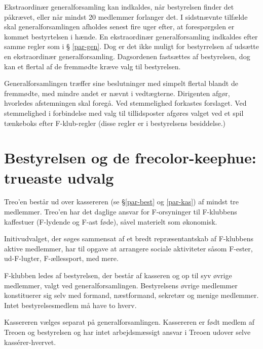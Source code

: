 \documentclass[a4paper,12pt,danish]{article}
\begin{document}
\begin{list}
\item Ekstraordinær generalforsamling kan indkaldes, når
  bestyrelsen finder det påkrævet, eller når mindst 20 medlemmer 
  forlanger det. I sidstnævnte tilfælde skal generalforsamlingen afholdes 
	senest fire uger efter, at forespørgslen er kommet bestyrtelsen i
	hænde.
  En ekstraordinær generalforsamling indkaldes efter samme regler som i \S
  \ref{par-gen}. Dog er det ikke muligt for bestyrrelsen af udsætte en ekstraordinær
  generalforsamling. Dagsordenen fastsættes af bestyrelsen, dog kan et flertal 
  af de fremmødte kræve valg til bestyrelsen. 
  
\item \label{gen-regler} Generalforsamlingen træffer sine beslutninger med 
  simpelt flertal blandt de fremmødte, med mindre andet er nævnt i vedtægterne.
  Dirigenten afgør, hvorledes afstemningen skal foregå.
  Ved stemmelighed forkastes forslaget. 
  Ved stemmelighed i forbindelse med valg til tillidsposter afgøres valget 
  ved et spil tænkeboks efter F-klub-regler (disse regler er i bestyrelsens besiddelse.)

\section{Bestyrelsen og de frecolor-keephue: trueaste udvalg}

\item Treo'en består ud over kassereren (se \S \ref{par-best} og
  \ref{par-kas}) af mindst tre medlemmer. Treo'en har det daglige
  ansvar for F-orsyninger til F-klubbens kaffestuer (F-lydende og F-ast føde),
  såvel materielt som økonomisk.
  
\item Initivudvalget, der søges sammensat af et bredt
  repræsentantskab af F-klubbens aktive medlemmer, har til opgave at
  arrangere sociale aktiviteter såsom F-ester, ud-F-lugter,
  F-ællessport, med mere.
  
\item \label{par-best} F-klubben ledes af bestyrelsen, der består
  af kasseren og op til syv øvrige medlemmer, valgt ved
  generalforsamlingen.  Bestyrelsens øvrige medlemmer konstituerer sig
  selv med formand, næstformand, sekretær og menige medlemmer. Intet
  bestyrelsesmedlem må have to hverv.

\item \label{par-kas} Kassereren vælges separat på
  generalforsamlingen.  Kassereren er født medlem af Treoen og
  bestyrelsen og har intet arbejdsmæssigt ansvar i Treoen udover
  selve kass\'{e}rer-hvervet.


\end{list}
\end{document}
